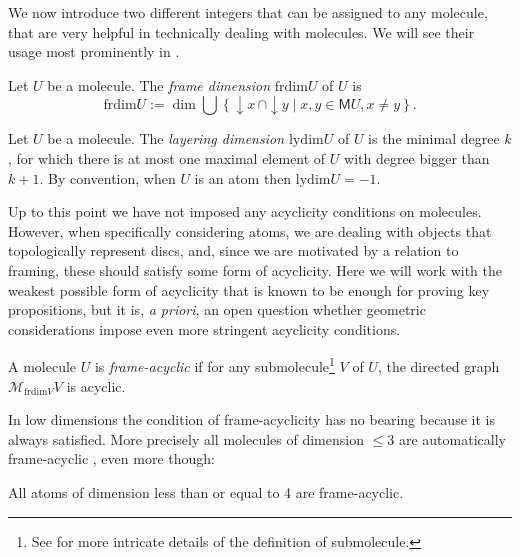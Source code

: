 \documentclass[12pt,a4paper]{article}
\numberwithin{equation}{section}
\begin{document}
We now introduce two different integers that can be assigned to any molecule, that are very helpful in technically dealing with molecules. We will see their usage most prominently in .

\begin{definition}
    Let $U$ be a molecule. The \emph{frame dimension} $\mathrm{frdim} U$ of $U$ is
    \begin{equation}
        \mathrm{frdim} U := \dim \bigcup \left\{ \downarrow\! x \, \cap \downarrow\! y \mid x, y \in \mathsf{M}U, x \neq y \right\}.
    \end{equation}
\end{definition}

\begin{definition}
    Let $U$ be a molecule. The \emph{layering dimension $\mathrm{lydim}U$} of $U$ is the minimal degree $k$, for which there is at most one maximal element of $U$ with degree bigger than $k+1$. By convention, when $U$ is an atom then $\mathrm{lydim} U = -1$. 
\end{definition}

Up to this point we have not imposed any acyclicity conditions on molecules. However, when specifically considering atoms, we are dealing with objects that topologically represent discs, and, since we are motivated by a relation to framing, these should satisfy some form of acyclicity. Here we will work with the weakest possible form of acyclicity that is known to be enough for proving key propositions, but it is, \emph{a priori}, an open question whether geometric considerations impose even more stringent acyclicity conditions.

\begin{definition}
    A molecule $U$ is \emph{frame-acyclic} if for any submolecule\footnote{See \cite[]{hadzihasanovic} for more intricate details of the definition of submolecule.} $V$ of $U$, the directed graph $\mathscr{M}_{\mathrm{frdim}V} V$ is acyclic.
\end{definition}

In low dimensions the condition of frame-acyclicity has no bearing because it is always satisfied. More precisely all molecules of dimension $\leq 3$ are automatically frame-acyclic \cite[Thm.\,8.4.11]{hadzihasanovic}, even more though:

\begin{lemma}\label{lem:fa_less5_automatic}
    All atoms of dimension less than or equal to 4 are frame-acyclic.
\end{lemma}
\end{document}
